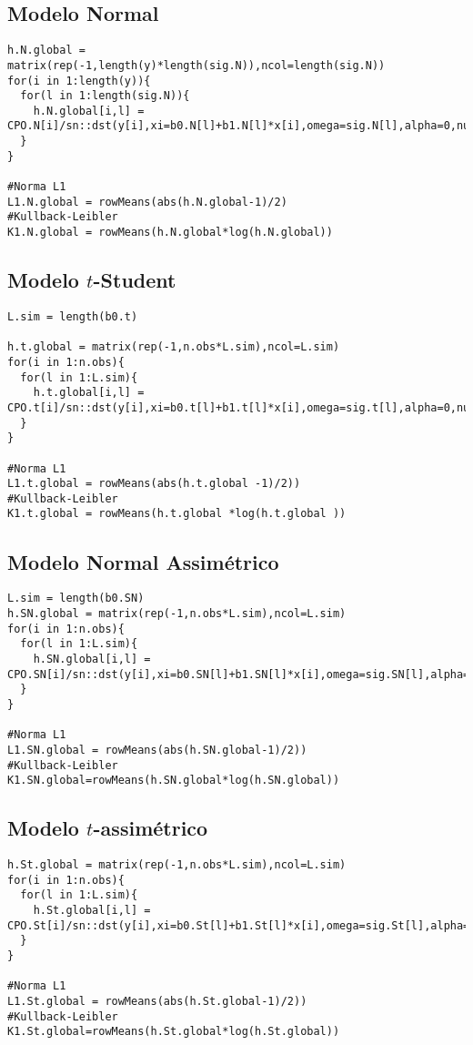 \subsection{Modelo Normal}
\begin{lstlisting}
h.N.global = matrix(rep(-1,length(y)*length(sig.N)),ncol=length(sig.N))
for(i in 1:length(y)){
  for(l in 1:length(sig.N)){
    h.N.global[i,l] = CPO.N[i]/sn::dst(y[i],xi=b0.N[l]+b1.N[l]*x[i],omega=sig.N[l],alpha=0,nu=Inf)
  }
}

#Norma L1
L1.N.global = rowMeans(abs(h.N.global-1)/2)
#Kullback-Leibler
K1.N.global = rowMeans(h.N.global*log(h.N.global))
\end{lstlisting}

\subsection{Modelo $t$-Student}
\begin{lstlisting}
L.sim = length(b0.t)

h.t.global = matrix(rep(-1,n.obs*L.sim),ncol=L.sim)
for(i in 1:n.obs){
  for(l in 1:L.sim){
    h.t.global[i,l] = CPO.t[i]/sn::dst(y[i],xi=b0.t[l]+b1.t[l]*x[i],omega=sig.t[l],alpha=0,nu=5)
  }
}

#Norma L1
L1.t.global = rowMeans(abs(h.t.global -1)/2))
#Kullback-Leibler
K1.t.global = rowMeans(h.t.global *log(h.t.global ))
\end{lstlisting}

\subsection{Modelo Normal Assimétrico}
\begin{lstlisting}
L.sim = length(b0.SN)
h.SN.global = matrix(rep(-1,n.obs*L.sim),ncol=L.sim)
for(i in 1:n.obs){
  for(l in 1:L.sim){
    h.SN.global[i,l] = CPO.SN[i]/sn::dst(y[i],xi=b0.SN[l]+b1.SN[l]*x[i],omega=sig.SN[l],alpha=lambda.SN[l],nu=Inf)
  }
}

#Norma L1
L1.SN.global = rowMeans(abs(h.SN.global-1)/2))
#Kullback-Leibler
K1.SN.global=rowMeans(h.SN.global*log(h.SN.global))
\end{lstlisting}

\subsection{Modelo $t$-assimétrico}
\begin{lstlisting}
h.St.global = matrix(rep(-1,n.obs*L.sim),ncol=L.sim)
for(i in 1:n.obs){
  for(l in 1:L.sim){
    h.St.global[i,l] = CPO.St[i]/sn::dst(y[i],xi=b0.St[l]+b1.St[l]*x[i],omega=sig.St[l],alpha=lambda.St[l],nu=5)
  }
}

#Norma L1
L1.St.global = rowMeans(abs(h.St.global-1)/2))
#Kullback-Leibler
K1.St.global=rowMeans(h.St.global*log(h.St.global))
\end{lstlisting}

